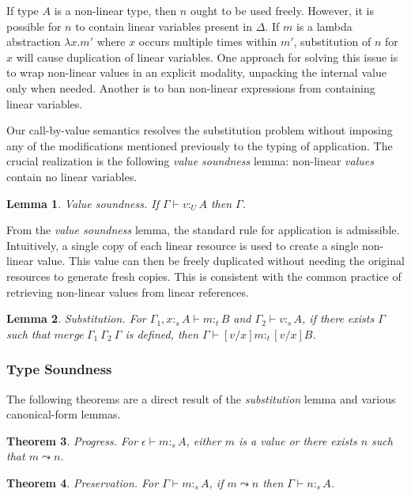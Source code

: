\documentclass{article}
\newtheorem{theorem}{Theorem}[section]
\newtheorem{lemma}[theorem]{Lemma}
\theoremstyle{definition}
\newcommand{\utype}{:_{\scriptscriptstyle U}}
\newcommand{\stype}[1]{:_#1}
\newcommand{\step}{\leadsto}
\newcommand{\pstep}{\leadsto}
\begin{document}
  If type $A$ is a non-linear type, then $n$ ought to be used freely. However, it is possible for $n$ to contain linear variables present in $\Delta$. If $m$ is a lambda abstraction $\lambda x.m'$ where $x$ occurs multiple times within $m'$, substitution of $n$ for $x$ will cause duplication of linear variables. One approach for solving this issue is to wrap non-linear values in an explicit modality, unpacking the internal value only when needed\cite{substitute,neel15}. Another is to ban non-linear expressions from containing linear variables\cite{llf,luo,qtt}.

  Our call-by-value semantics resolves the substitution problem without imposing any of the modifications mentioned previously to the typing of application. The crucial realization is the following \textit{value soundness} lemma: non-linear \textit{values} contain no linear variables.

  \begin{lemma}
    Value soundness. If $\Gamma \vdash v \utype A$ then $\Gamma$.
  \end{lemma}

  From the \textit{value soundness} lemma, the standard rule for application is admissible. Intuitively, a single copy of each linear resource is used to create a single non-linear value. This value can then be freely duplicated without needing the original resources to generate fresh copies. This is consistent with the common practice of retrieving non-linear values from linear references.

  \begin{lemma}
    Substitution. For $\Gamma_1, x \stype{s} A \vdash m \stype{t} B$ and $\Gamma_2 \vdash v \stype{s} A$, if there exists $\Gamma$ such that $merge\ \Gamma_1\ \Gamma_2\ \Gamma$ is defined, then $\Gamma \vdash [v/x]m \stype{t} [v/x]B$.
  \end{lemma}

  \subsubsection{Type Soundness}
  The following theorems are a direct result of the \textit{substitution} lemma and various canonical-form lemmas. 

  \begin{theorem}
    Progress. For $\epsilon \vdash m \stype{s} A$, either $m$ is a value or there exists $n$ such that $m \step n$.
  \end{theorem}

  \begin{theorem}
    Preservation. For $\Gamma \vdash m \stype{s} A$, if $m \pstep n$ then $\Gamma \vdash n \stype{s} A$.
  \end{theorem}
\end{document}
